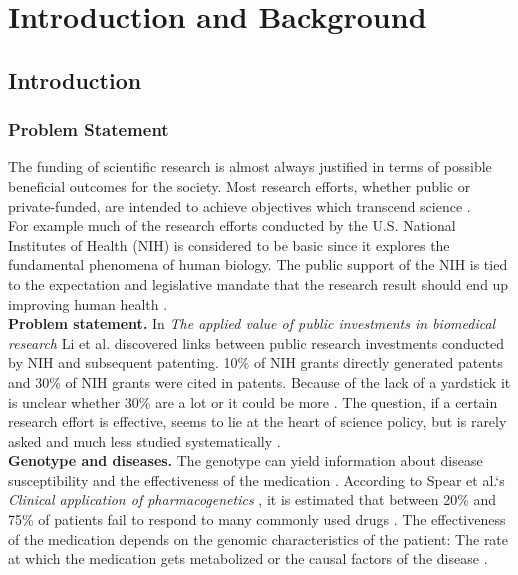 \part{Introduction and Background}

\chapter{Introduction}
\label{cha:intro}

\section{Problem Statement}

The funding of scientific research is almost always justified in terms of possible beneficial outcomes for the society. Most research efforts, whether public or private-funded, are intended to achieve objectives which transcend science \cite{Sarewitz2007TheNH}. \\

For example much of the research efforts conducted by the U.S. National Institutes of Health (NIH) is considered to be basic since it explores the fundamental phenomena of human biology. The public support of the NIH is tied to the expectation and legislative mandate that the research result should end up improving human health \cite{Sarewitz2007TheNH}. \\

\textbf{Problem statement.} In \textit{The applied value of public investments in biomedical research}\cite{Li2017TheAV} Li et al. discovered links between public research investments conducted by NIH and subsequent patenting. 10\% of NIH grants directly generated patents and 30\% of NIH grants were cited in patents. Because of the lack of a yardstick it is unclear whether 30\% are a lot or it could be more \cite{Li2017TheAV}. The question, if a certain research effort is effective, seems to lie at the heart of science policy, but is rarely asked and much less studied systematically \cite{Sarewitz2007TheNH}. \\

\textbf{Genotype and diseases.} The genotype can yield information about disease susceptibility and the effectiveness of the medication \cite{Brunicardi2011OverviewOT}. According to Spear et al.`s \textit{Clinical application of pharmacogenetics} \cite{Spear2001ClinicalAO}, it is estimated that between 20\% and 75\% of patients fail to respond to many commonly used drugs \cite{Spear2001ClinicalAO}. The effectiveness of the medication depends on the genomic characteristics of the patient: The rate at which the medication gets metabolized or the causal factors of the disease \cite{Brunicardi2011OverviewOT}. \\

